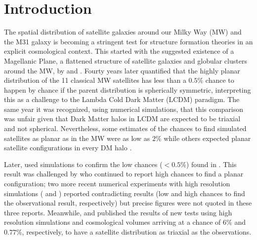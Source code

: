 \documentclass[a4paper,fleqn,usenatbib]{mnras}
\begin{document}
\section{Introduction}

The spatial distribution of satellite galaxies around our Milky Way
(MW) and the M31 galaxy is becoming a stringent test for structure
formation theories in an explicit cosmological context. 
This started with the suggested existence of a Magellanic Plane, a flattened
structure of satellite galaxies and globular clusters around the MW,
by \cite{1976RGOB..182..241K} and \cite{1976MNRAS.174..695L}.  
Fourty years later \cite{2005A&A...431..517K} quantified that the
highly planar distribution of the 11 classical MW satellites has less
than a $0.5\%$ chance to happen by chance if the
parent distribution is spherically symmetric, interpreting this as a
challenge to the Lambda Cold Dark Matter (LCDM) paradigm.
The same year it was recognized, using numerical simulations, that
this comparison was unfair given that Dark Matter halos in LCDM
are expected to be triaxial and not spherical.
Nevertheless, some estimates of the chances to find simulated satellites as
planar as in the MW 
were as low as $2\%$ \citep{2005ApJ...629..219Z} while others expected
planar satellite configurations in every DM halo
\citep{2005MNRAS.363..146L}.

Later, \cite{2007MNRAS.374.1125M} used simulations to confirm the low
chances ($<0.5\%$) found in \cite{2005A&A...431..517K}.
This result was challenged by \cite{2009MNRAS.399..550L} who continued
to report high chances to find a planar configuration;
two more recent numerical experiments with high resolution simulations
(\cite{2013MNRAS.429..725S} and \cite{2016MNRAS.457.1931S}) reported
contradicting results (low and high chances to find the observational
result, respectively) but precise figures were not quoted in these three reports. 
Meanwhile, \cite{2013MNRAS.429.1502W} and \cite{2014ApJ...789L..24P} published
the results of new tests using high resolution simulations and cosmological
volumes arriving at a chance of $6\%$ and $0.77\%$, respectively, to
have a satellite distribution as triaxial as the observations. 
\end{document}
